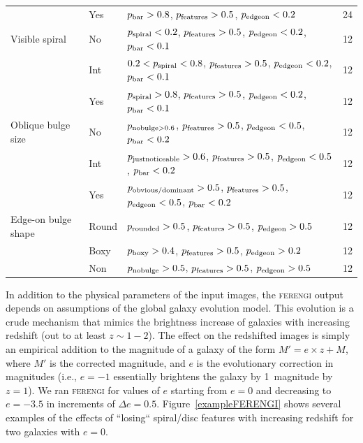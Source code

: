 \documentclass[usenatbib]{mn2e}
\newcommand{\ferengi}{\textsc{ferengi}}
\begin{document}
\begin{table}
\begin{tabular}{lllc}
                    & Yes   & $p_{\rm bar} > 0.8$, $p_{\rm features} > 0.5$, $p_{\rm edgeon} < 0.2$                                 & 24 \\
Visible spiral      & No    & $p_{\rm spiral} < 0.2$, $p_{\rm features} > 0.5$, $p_{\rm edgeon} < 0.2$, $p_{\rm bar} < 0.1$         & 12 \\
                    & Int   & $0.2 < p_{\rm spiral} < 0.8$, $p_{\rm features} > 0.5$, $p_{\rm edgeon} < 0.2$, $p_{\rm bar} < 0.1$   & 12 \\
                    & Yes   & $p_{\rm spiral} > 0.8$, $p_{\rm features} > 0.5$, $p_{\rm edgeon} < 0.2$, $p_{\rm bar} < 0.1$         & 12 \\
Oblique bulge size  & No    & $p_{\rm nobulge>0.6}$, $p_{\rm features} > 0.5$, $p_{\rm edgeon} < 0.5$, $p_{\rm bar} < 0.2$          & 12 \\
                    & Int   & $p_{\rm justnoticeable}>0.6$, $p_{\rm features} > 0.5$, $p_{\rm edgeon} < 0.5$, $p_{\rm bar} < 0.2$   & 12 \\
                    & Yes   & $p_{\rm obvious/dominant}>0.5$, $p_{\rm features} > 0.5$, $p_{\rm edgeon} < 0.5$, $p_{\rm bar} < 0.2$ & 12 \\
Edge-on bulge shape & Round & $p_{\rm rounded}>0.5$, $p_{\rm features} > 0.5$, $p_{\rm edgeon} > 0.5$                               & 12 \\
                    & Boxy  & $p_{\rm boxy}>0.4$, $p_{\rm features} > 0.5$, $p_{\rm edgeon} > 0.2$                                  & 12 \\
                    & Non   & $p_{\rm nobulge}>0.5$, $p_{\rm features} > 0.5$, $p_{\rm edgeon} > 0.5$                               & 12 \\
\hline\hline
\end{tabular}
\end{table}


In addition to the physical parameters of the input images, the \ferengi{} output depends on assumptions of the global galaxy evolution model. This evolution is a crude mechanism that mimics the brightness increase of galaxies with increasing redshift (out to at least $z\sim1-2$). The effect on the redshifted images is simply an empirical addition to the magnitude of a galaxy of the form $M' = e\times z + M$, where $M'$ is the corrected magnitude, and $e$ is the evolutionary correction in magnitudes (i.e., $e=-1$ essentially brightens the galaxy by 1~magnitude by $z=1$). We ran \ferengi{} for values of $e$ starting from $e=0$ and decreasing to $e=-3.5$ in increments of $\Delta e = 0.5$. Figure~\ref{exampleFERENGI} shows several examples of the effects of ``losing`` spiral/disc features with increasing redshift for two galaxies with $e=0$. 
\end{document}
